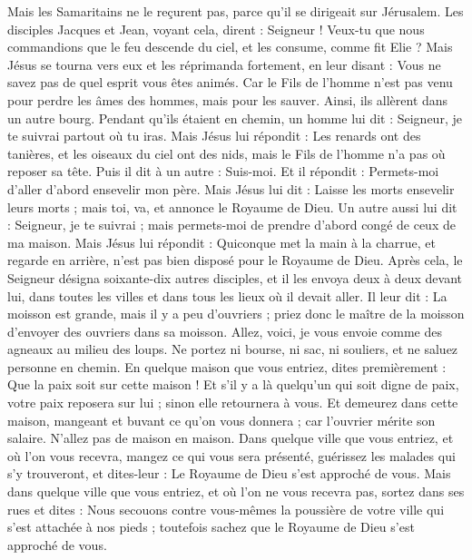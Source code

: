 \begin{multicols}{2}
{Mais les Samaritains ne le reçurent pas, parce qu'il se dirigeait sur Jérusalem.
Les disciples Jacques et Jean, voyant cela, dirent : Seigneur ! Veux-tu que nous commandions que le feu descende du ciel, et les consume, comme fit Elie ?
Mais Jésus se tourna vers eux et les réprimanda fortement, en leur disant : Vous ne savez pas de quel esprit vous êtes animés.
Car le Fils de l'homme n'est pas venu pour perdre les âmes des hommes, mais pour les sauver. Ainsi, ils allèrent dans un autre bourg.
Pendant qu’ils étaient en chemin, un homme lui dit : Seigneur, je te suivrai partout où tu iras.
Mais Jésus lui répondit : Les renards ont des tanières, et les oiseaux du ciel ont des nids, mais le Fils de l'homme n'a pas où reposer sa tête.
Puis il dit à un autre : Suis-moi. Et il répondit : Permets-moi d'aller d’abord ensevelir mon père.
Mais Jésus lui dit : Laisse les morts ensevelir leurs morts ; mais toi, va, et annonce le Royaume de Dieu.
Un autre aussi lui dit : Seigneur, je te suivrai ; mais permets-moi de prendre d’abord congé de ceux de ma maison.
Mais Jésus lui répondit : Quiconque met la main à la charrue, et regarde en arrière, n'est pas bien disposé pour le Royaume de Dieu.
\VerseOne{}Après cela, le Seigneur désigna soixante-dix autres disciples, et il les envoya deux à deux devant lui, dans toutes les villes et dans tous les lieux où il devait aller.
Il leur dit : La moisson est grande, mais il y a peu d'ouvriers ; priez donc le maître de la moisson d’envoyer des ouvriers dans sa moisson.
Allez, voici, je vous envoie comme des agneaux au milieu des loups.
Ne portez ni bourse, ni sac, ni souliers, et ne saluez personne en chemin.
En quelque maison que vous entriez, dites premièrement : Que la paix soit sur cette maison !
Et s'il y a là quelqu'un qui soit digne de paix, votre paix reposera sur lui ; sinon elle retournera à vous.
Et demeurez dans cette maison, mangeant et buvant ce qu’on vous donnera ; car l'ouvrier mérite son salaire. N’allez pas de maison en maison.
Dans quelque ville que vous entriez, et où l’on vous recevra, mangez ce qui vous sera présenté,
guérissez les malades qui s’y trouveront, et dites-leur : Le Royaume de Dieu s’est approché de vous.
Mais dans quelque ville que vous entriez, et où l’on ne vous recevra pas, sortez dans ses rues et dites :
Nous secouons contre vous-mêmes la poussière de votre ville qui s'est attachée à nos pieds ; toutefois sachez que le Royaume de Dieu s’est approché de vous.
}
\end{multicols}
